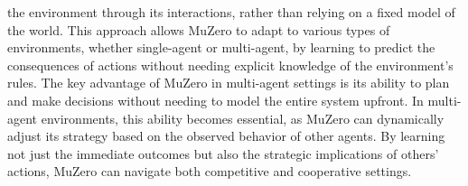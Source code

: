 the environment through its interactions, rather than relying on a 
fixed model of the world. This approach allows MuZero to 
adapt to various types of environments, whether single-agent or 
multi-agent, by learning to predict the consequences of actions 
without needing explicit knowledge of the environment’s rules. 
The key advantage of MuZero in multi-agent settings is its ability 
to plan and make decisions without needing to model the entire system 
upfront. In multi-agent environments, this ability becomes essential, 
as MuZero can dynamically adjust its strategy based on the observed 
behavior of other agents. By learning not just the immediate outcomes 
but also the strategic implications of others' actions, MuZero can navigate both competitive and cooperative settings.